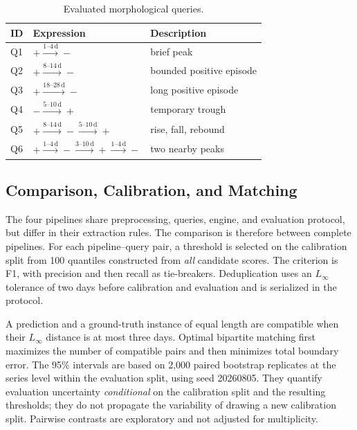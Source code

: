 \begin{table}[H]
\centering
\caption{Evaluated morphological queries.}
\label{tab:queries}
\small
\begin{tabularx}{\textwidth}{@{}p{1.1cm}p{5.2cm}X@{}}
\toprule
ID & Expression & Description \\
\midrule
Q1 & $+\xrightarrow{1\text{--}4\,\mathrm{d}}-$ & brief peak \\
Q2 & $+\xrightarrow{8\text{--}14\,\mathrm{d}}-$ & bounded positive episode \\
Q3 & $+\xrightarrow{18\text{--}28\,\mathrm{d}}-$ & long positive episode \\
Q4 & $-\xrightarrow{5\text{--}10\,\mathrm{d}}+$ & temporary trough \\
Q5 & $+\xrightarrow{8\text{--}14\,\mathrm{d}}-\xrightarrow{5\text{--}10\,\mathrm{d}}+$ & rise, fall, rebound \\
Q6 & $+\xrightarrow{1\text{--}4\,\mathrm{d}}-\xrightarrow{3\text{--}10\,\mathrm{d}}+\xrightarrow{1\text{--}4\,\mathrm{d}}-$ & two nearby peaks \\
\bottomrule
\end{tabularx}
\end{table}

\subsection{Comparison, Calibration, and Matching}

The four pipelines share preprocessing, queries, engine, and evaluation protocol, but differ in their extraction rules. The comparison is therefore between complete pipelines. For each pipeline--query pair, a threshold is selected on the calibration split from 100 quantiles constructed from \emph{all} candidate scores. The criterion is F1, with precision and then recall as tie-breakers. Deduplication uses an $L_\infty$ tolerance of two days before calibration and evaluation and is serialized in the protocol.

A prediction and a ground-truth instance of equal length are compatible when their $L_\infty$ distance is at most three days. Optimal bipartite matching first maximizes the number of compatible pairs and then minimizes total boundary error. The 95\% intervals are based on 2,000 paired bootstrap replicates at the series level within the evaluation split, using seed 20260805. They quantify evaluation uncertainty \emph{conditional} on the calibration split and the resulting thresholds; they do not propagate the variability of drawing a new calibration split. Pairwise contrasts are exploratory and not adjusted for multiplicity.

